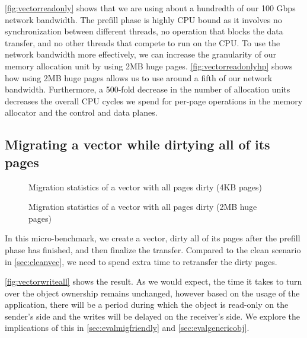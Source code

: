 \autoref{fig:vectorreadonly} shows that we are using about a hundredth of our 100 Gbps
network bandwidth. The prefill phase is highly CPU bound as it involves no
synchronization between different threads, no operation that blocks the data
transfer, and no other threads that compete to run on the CPU.
To use the
network bandwidth more effectively, we can increase the granularity of our
memory allocation unit by using 2MB huge pages. \autoref{fig:vectorreadonlyhp} shows
how using 2MB huge pages allows us to use around a fifth of our network bandwidth.
Furthermore, a 500-fold decrease in the number of allocation units decreases
the overall CPU cycles we spend for per-page operations in the memory allocator
and the control and data planes.

\subsection{Migrating a vector while dirtying all of its pages}
\label{sec:dirtyvector}
\begin{figure}[tp]
    \begin{center}
        
    \end{center}
    \caption{Migration statistics of a vector with all pages dirty (4KB pages)}
    \label{fig:vectorwriteall}
\end{figure}

\begin{figure}[tp]
    \begin{center}
        
    \end{center}
    \caption{Migration statistics of a vector with all pages dirty (2MB huge pages)}
    \label{fig:vectorwriteallhp}
\end{figure}

In this micro-benchmark, we create a vector, dirty all of its pages after the
prefill phase has finished, and then finalize the transfer. Compared to the
clean scenario in \autoref{sec:cleanvec}, we need to spend extra time to
retransfer the dirty pages.

\autoref{fig:vectorwriteall} shows the result. As we would expect, the time it takes to turn over
the object ownership remains unchanged, however based on the usage of the
application, there will be a period during which the object is read-only on the
sender's side and the writes will be delayed on the receiver's side. We
explore the implications of this in \autoref{sec:evalmigfriendly} and
\autoref{sec:evalgenericobj}.


